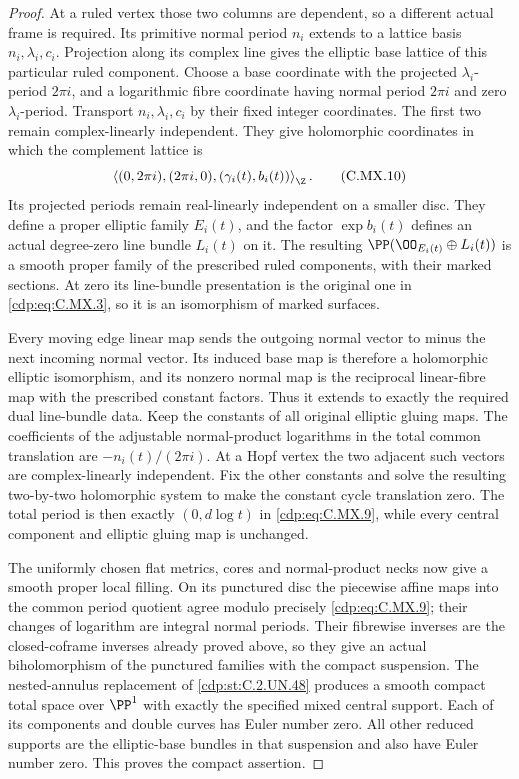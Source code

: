 \begin{proof}
At a ruled vertex those two columns are
dependent, so a different actual frame is
required. Its primitive normal period $n_i$
extends to a lattice basis $n_i,\lambda_i,c_i$.
Projection along its complex line gives the
elliptic base lattice of this particular
ruled component. Choose a base coordinate
with the projected $\lambda_i$-period $2\pi i$,
and a logarithmic fibre coordinate having
normal period $2\pi i$ and zero $\lambda_i$-period.
Transport $n_i,\lambda_i,c_i$ by their fixed
integer coordinates. The first two remain
complex-linearly independent. They give
holomorphic coordinates in which the complement
lattice is
\[
        \left\langle
          (0,2\pi i),(2\pi i,0),
                      (\gamma_i(t),b_i(t))
                                  \right\rangle_{\Z} .   \tag{C.MX.10}\label{cdp:eq:C.MX.10}
\]
Its projected periods remain real-linearly
independent on a smaller disc. They define
a proper elliptic family $E_i(t)$, and the
factor $\exp b_i(t)$ defines an actual
degree-zero line bundle $L_i(t)$ on it.
The resulting
$\PP(\OO_{E_i(t)}\oplus L_i(t))$ is a smooth
proper family of the prescribed ruled
components, with their marked sections.
At zero its line-bundle presentation is
the original one in \eqref{cdp:eq:C.MX.3}, so it is
an isomorphism of marked surfaces.

Every moving edge linear map sends the
outgoing normal vector to minus the next
incoming normal vector. Its induced base
map is therefore a holomorphic elliptic
isomorphism, and its nonzero normal map
is the reciprocal linear-fibre map with
the prescribed constant factors. Thus it
extends to exactly the required dual
line-bundle data. Keep the constants of
all original elliptic gluing maps.
The coefficients of the adjustable
normal-product logarithms in the total
common translation are
$-n_i(t)/(2\pi i)$. At a Hopf vertex
the two adjacent such vectors are
complex-linearly independent. Fix the
other constants and solve the resulting
two-by-two holomorphic system to make
the constant cycle translation zero.
The total period is then exactly
$(0,d\log t)$ in \eqref{cdp:eq:C.MX.9}, while every
central component and elliptic gluing
map is unchanged.

The uniformly chosen flat metrics, cores
and normal-product necks now give a
smooth proper local filling. On its
punctured disc the piecewise affine
maps into the common period quotient
agree modulo precisely \eqref{cdp:eq:C.MX.9};
their changes of logarithm are integral
normal periods. Their fibrewise inverses
are the closed-coframe inverses already
proved above, so they give an actual
biholomorphism of the punctured
families with the compact suspension.
The nested-annulus replacement of
\ref{cdp:st:C.2.UN.48} produces a smooth compact total
space over $\PP^1$ with exactly the
specified mixed central support.
Each of its components and double
curves has Euler number zero. All
other reduced supports are the
elliptic-base bundles in that
suspension and also have Euler
number zero. This proves the
compact assertion.


\end{proof}
